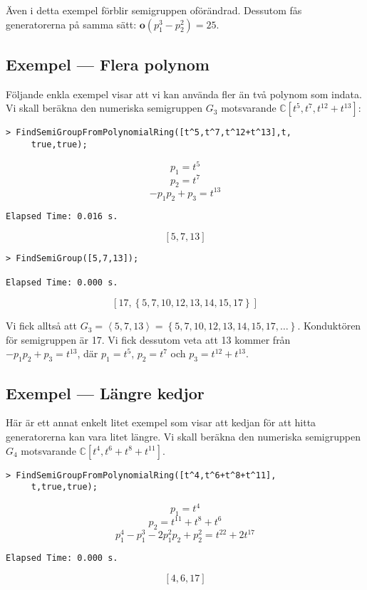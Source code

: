 Även i detta exempel förblir semigruppen oförändrad. Dessutom fås generatorerna på samma sätt: $\mathbf{o}(p_1^3 - p_2^2) = 25$.

\subsection{Exempel --- Flera polynom}

Följande enkla exempel visar att vi kan använda fler än två polynom som indata. Vi skall beräkna den numeriska semigruppen $G_3$ motsvarande $\mathbb{C}\left[t^5, t^7, t^{12} + t^{13}\right]$:

\begin{verbatim}
> FindSemiGroupFromPolynomialRing([t^5,t^7,t^12+t^13],t,
     true,true);
\end{verbatim}
\[p_1 = t^5\]
\[p_2 = t^7\]
\[-p_1 p_2 + p_3 = t^{13}\]
\begin{verbatim}
Elapsed Time: 0.016 s.
\end{verbatim}
\[\left[5, 7, 13\right]\]

\begin{verbatim}
> FindSemiGroup([5,7,13]);

Elapsed Time: 0.000 s.
\end{verbatim}
\[\left[17, \left\{5, 7, 10, 12, 13, 14, 15, 17\right\}\right]\]

Vi fick alltså att $G_3 = \left<5, 7, 13\right>=\left\{5, 7, 10, 12, 13, 14, 15, 17, \ldots\right\}$. Konduktören för semigruppen är 17. Vi fick dessutom veta att 13 kommer från $-p_1 p_2 + p_3 = t^{13}$, där $p_1 = t^5$, $p_2 = t^7$ och $p_3 = t^{12} + t^{13}$.

\subsection{Exempel --- Längre kedjor}

Här är ett annat enkelt litet exempel som visar att kedjan för att hitta generatorerna kan vara litet längre. Vi skall beräkna den numeriska semigruppen $G_4$ motsvarande $\mathbb{C}\left[t^4, t^6 + t^8 + t^{11}\right]$.

\begin{verbatim}
> FindSemiGroupFromPolynomialRing([t^4,t^6+t^8+t^11],
     t,true,true);
\end{verbatim}
\[p_1 = t^4\]
\[p_2 = t^{11}+t^8+t^6\]
\[p_1^4-p_1^3-2p_1^2 p_2+p_2^2 = t^{22}+2t^{17}\]
\begin{verbatim}
Elapsed Time: 0.000 s.
\end{verbatim}
\[\left[4, 6, 17\right]\]

